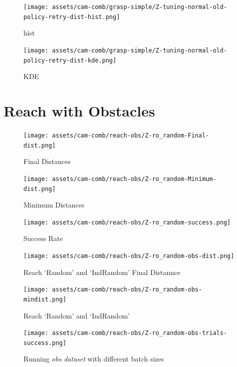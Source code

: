 \begin{figure}[H]
  \centering
  \texttt{[image: assets/cam-comb/grasp-simple/Z-tuning-normal-old-policy-retry-dist-hist.png]}
  \caption{hist}
\end{figure}

\begin{figure}[H]
  \centering
  \texttt{[image: assets/cam-comb/grasp-simple/Z-tuning-normal-old-policy-retry-dist-kde.png]}
  \caption{KDE}
\end{figure}



\section{Reach with Obstacles}

\begin{figure}[H]
  \centering
  \texttt{[image: assets/cam-comb/reach-obs/Z-ro\_random-Final-dist.png]}
  \caption{Final Distances}
\end{figure}

\begin{figure}[H]
  \centering
  \texttt{[image: assets/cam-comb/reach-obs/Z-ro\_random-Minimum-dist.png]}
  \caption{Minimum Distances}
\end{figure}

\begin{figure}[H]
  \centering
  \texttt{[image: assets/cam-comb/reach-obs/Z-ro\_random-success.png]}
  \caption{Success Rate}
\end{figure}

\begin{figure}[htpb]
  \centering
  \texttt{[image: assets/cam-comb/reach-obs/Z-ro\_random-obs-dist.png]}
  \caption{Reach `Random' and `IndRandom' Final Distannce}
\end{figure}

\begin{figure}[htpb]
  \centering
  \texttt{[image: assets/cam-comb/reach-obs/Z-ro\_random-obs-mindist.png]}
  \caption{Reach `Random' and `IndRandom'}
\end{figure}

\begin{figure}[htpb]
  \centering
  \texttt{[image: assets/cam-comb/reach-obs/Z-ro\_random-obs-trials-success.png]}
  \caption{Running \emph{obs dataset} with different batch sizes}\label{apx:Z-ro_random-obs-trials-success}
\end{figure}
